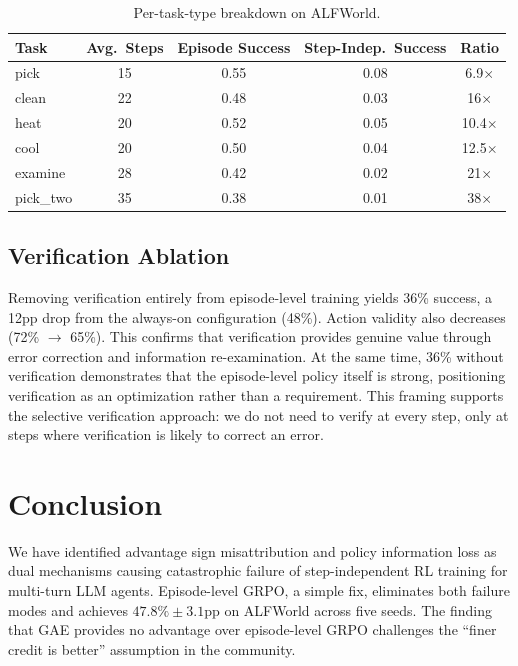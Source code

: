 \documentclass[10pt]{article}
\begin{document}
\begin{table}[h]
\centering
\caption{Per-task-type breakdown on ALFWorld.}
\label{tab:pertask}
\begin{tabular}{lcccc}
\toprule
Task & Avg.\ Steps & Episode Success & Step-Indep.\ Success & Ratio \\
\midrule
pick      & 15 & 0.55 & 0.08 & 6.9$\times$ \\
clean     & 22 & 0.48 & 0.03 & 16$\times$ \\
heat      & 20 & 0.52 & 0.05 & 10.4$\times$ \\
cool      & 20 & 0.50 & 0.04 & 12.5$\times$ \\
examine   & 28 & 0.42 & 0.02 & 21$\times$ \\
pick\_two & 35 & 0.38 & 0.01 & 38$\times$ \\
\bottomrule
\end{tabular}
\end{table}

\subsection{Verification Ablation}

Removing verification entirely from episode-level training yields 36\% success, a 12pp drop from the always-on configuration (48\%). Action validity also decreases (72\% $\to$ 65\%). This confirms that verification provides genuine value through error correction and information re-examination. At the same time, 36\% without verification demonstrates that the episode-level policy itself is strong, positioning verification as an optimization rather than a requirement. This framing supports the selective verification approach: we do not need to verify at every step, only at steps where verification is likely to correct an error.

\section{Conclusion}

We have identified advantage sign misattribution and policy information loss as dual mechanisms causing catastrophic failure of step-independent RL training for multi-turn LLM agents. Episode-level GRPO, a simple fix, eliminates both failure modes and achieves $47.8\% \pm 3.1$pp on ALFWorld across five seeds. The finding that GAE provides no advantage over episode-level GRPO challenges the ``finer credit is better'' assumption in the community.
\end{document}
